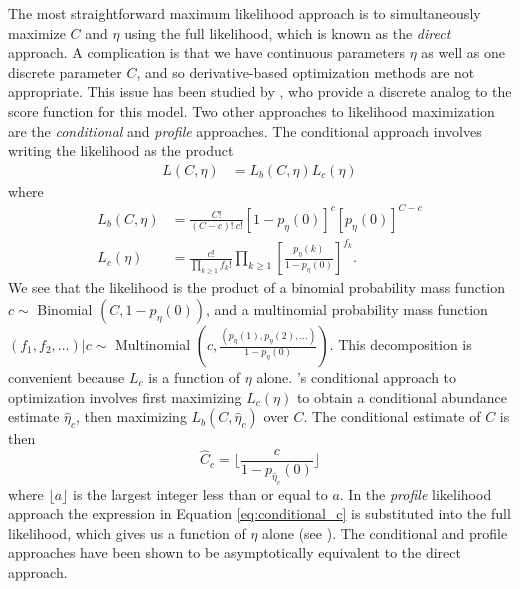 \documentclass[12pt]{article}
\newcommand{\kmax}{k_{\text{max}}}
\begin{document}
The most straightforward maximum likelihood approach is to simultaneously maximize $C$ and $\eta$ using the full likelihood, which is known as the \textit{direct} approach.  A complication is that we have continuous parameters $\eta$ as well as one discrete parameter $C$, and so derivative-based optimization methods are not appropriate.  This issue has been studied by \citet{lindsay_1987}, who provide a discrete analog to the score function for this model.  %
Two other approaches to likelihood maximization are the \textit{conditional} and \textit{profile} approaches.  The conditional approach \citep{sanathanan_1977} involves writing the likelihood as the product
\begin{align}
 L(C, \eta) &= L_b(C, \eta)L_c(\eta) \label{eq:likelihood}
\end{align}
where
 \begin{align}
 L_b(C, \eta) &= \frac{C!}{(C-c)! \ c!} \left[1 - p_{\eta}(0) \right]^c \left[ p_{\eta}(0) \right]^{C-c}  %
  \label{eq:binomial_likelihood}\\
 L_c(\eta) &= \frac{c!}{\displaystyle  \prod_{k \geq 1} f_k!} \prod_{k \geq 1} \left[ \frac{p_{\eta}(k)}{1-p_{\eta}(0)} \right]^{f_k}. \label{eq:conditional_likelihood} %
\end{align}
We see that the likelihood is the product of a binomial probability mass function $c \sim$ Binomial $\left(C, 1- p_{\eta}(0)\right)$, and a multinomial probability mass function $(f_1, f_2, \ldots)|c \sim$  Multinomial $\left(c,  \frac{(p_{\eta}(1), p_{\eta}(2), \ldots)}{1-p_{\eta}(0)}\right)$.
This decomposition is convenient because $L_c$ is a function of $\eta$ alone.
\citet{sanathanan_1977}'s conditional approach to optimization involves first maximizing  $L_c(\eta)$ to obtain a conditional abundance estimate $\widehat{\eta}_c$, then maximizing $L_b(C, \widehat{\eta}_c)$ over $C$.
The conditional estimate of $C$ is then
\begin{equation}
\widehat{C}_c = \Biggl\lfloor \frac{c}{1-p_{\widehat{\eta}_c}(0)} \Biggr\rfloor \label{eq:conditional_c}
\end{equation}
where $\lfloor a \rfloor$ is the largest integer less than or equal to $a$.  In the \textit{profile} likelihood approach the expression in Equation \eqref{eq:conditional_c} is substituted into the full likelihood, which gives us a function of $\eta$ alone (see \citet{wang_2005}).  The conditional and profile approaches have been shown to be asymptotically equivalent to the direct approach.
\end{document}
